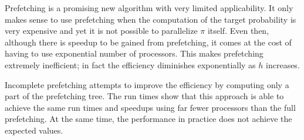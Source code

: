 \documentclass[11pt,letterpaper]{article}       %
\begin{document}
Prefetching is a promising new algorithm with very limited applicability.  
It only makes sense to use prefetching when the computation of the target 
probability is very expensive and yet it is not possible to parallelize
$\pi$ itself.  Even then, although there is speedup to be gained from 
prefetching, it comes at the cost of having to use exponential 
number of processors.  This makes prefetching extremely inefficient; in fact 
the efficiency diminishes exponentially as $h$ increases.  

Incomplete prefetching attempts to improve the efficiency by computing 
only a part of the prefetching tree.  The run times show that this approach is 
able to achieve the same run times and speedups using far fewer processors 
than the full prefetching.  At the same time, the performance in 
practice does not achieve the expected values.
   



\end{document}
